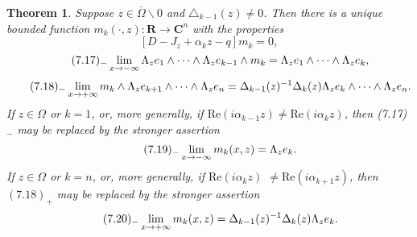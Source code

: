 \documentclass{surv-l}
\theoremstyle{plain}
\newtheorem{theorem}{Theorem}[section]
\theoremstyle{definition}
\numberwithin{equation}{chapter}
\begin{document}
\begin{theorem}\label{chap01:thm7.15}
Suppose $z\in\overline{\Omega}\backslash 0$ and $\triangle_{k-1}(z)\neq 0$. Then there is a unique bounded function $m_{k}(\cdot, z):\mathbf{R}\rightarrow \mathbf{C}^{n}$ with the properties
\setcounter{equation}{15}
\begin{equation}\label{eq7.16}
[D-J_{z}+\alpha_{k}z-q]m_{k}=0,
\end{equation}
\begin{equation*}
\tag*{$(7.17)_{-}$}\displaystyle \lim_{x\rightarrow-\infty} \Lambda_{z}e_{1}\wedge\cdots\wedge\Lambda_{z}e_{k-1}\wedge m_{k}=\Lambda_{z}e_{1}\wedge\cdots\wedge\Lambda_{z}e_{k},
\end{equation*}
\begin{equation*}
\tag*{$(7.18)_{-}$}\displaystyle \lim_{x\rightarrow+\infty}  m_{k}\wedge\Lambda_{z}e_{k+1}\wedge\cdots\wedge\Lambda_{z}e_{n}=\Delta_{k-1}(z)^{-1}\Delta_{k}(z)\Lambda_{z}e_{k}\wedge\cdots\wedge\Lambda_{z}e_{n}.
\end{equation*}
If $ z\in\Omega$ or $k=1$, or, more generally, if $\mathrm{Re}(i\alpha_{k-1}z)\neq\mathrm{Re}(i\alpha_{k}z)$, then \emph{(7.17)}$_{-}$ may be replaced by the stronger assertion
\begin{equation*}
\tag*{$(7.19)_{-}$} \displaystyle \lim_{x\rightarrow-\infty} m_{k}(x, z)=\Lambda_{z}e_{k}.
\end{equation*}
If $ z\in\Omega$ or $k=n$, or, more generally, if $\mathrm{Re}(i\alpha_{k}z)$ $\neq\mathrm{Re}(i\alpha_{k+1}z)$, then $(7.18)_{+}$ may be replaced by the stronger assertion
\begin{equation*}
\tag*{$(7.20)_{-}$} \displaystyle \lim_{x\rightarrow+\infty} m_{k}(x, z)=\Delta_{k-1}(z)^{-1}\Delta_{k}(z)\Lambda_{z}e_{k}.
\end{equation*}
\end{theorem}
\end{document}
